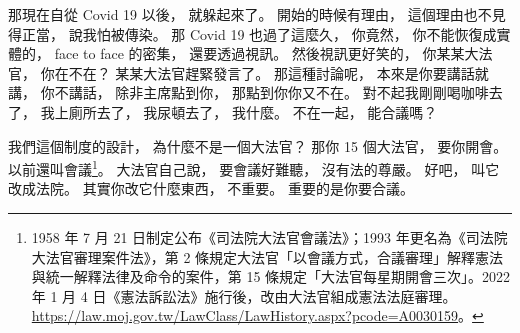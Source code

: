 \hypertarget{w01:cue:970}{}那現在自從 Covid 19 以後，
\hypertarget{w01:cue:971}{}就躲起來了。
\hypertarget{w01:cue:972}{}開始的時候有理由，
\hypertarget{w01:cue:973}{}這個理由也不見得正當，
\hypertarget{w01:cue:974}{}說我怕被傳染。
\hypertarget{w01:cue:975}{}那 Covid 19 也過了這麼久，
\hypertarget{w01:cue:976}{}你竟然，
\hypertarget{w01:cue:977}{}你不能恢復成實體的，
\hypertarget{w01:cue:978}{}face to face 的密集，
\hypertarget{w01:cue:979}{}還要透過視訊。
\hypertarget{w01:cue:980}{}然後視訊更好笑的，
\hypertarget{w01:cue:981}{}你某某大法官，
\hypertarget{w01:cue:982}{}你在不在？
\hypertarget{w01:cue:983}{}某某大法官趕緊發言了。
\hypertarget{w01:cue:984}{}那這種討論呢，
\hypertarget{w01:cue:985}{}本來是你要講話就講，
\hypertarget{w01:cue:986}{}你不講話，
\hypertarget{w01:cue:987}{}除非主席點到你，
\hypertarget{w01:cue:988}{}那點到你你又不在。
\hypertarget{w01:cue:989}{}對不起我剛剛喝咖啡去了，
\hypertarget{w01:cue:990}{}我上廁所去了，
\hypertarget{w01:cue:991}{}我尿頓去了，
\hypertarget{w01:cue:992}{}我什麼。
\hypertarget{w01:cue:993}{}不在一起，
\hypertarget{w01:cue:994}{}能合議嗎？

\hypertarget{w01:cue:995}{}我們這個制度的設計，
\hypertarget{w01:cue:996}{}為什麼不是一個大法官？
\hypertarget{w01:cue:997}{}那你 15 個大法官，
\hypertarget{w01:cue:998}{}要你開會。
\hypertarget{w01:cue:999}{}以前還叫會議\footnote{1958 年 7 月 21 日制定公布《司法院大法官會議法》；1993 年更名為《司法院大法官審理案件法》，第 2 條規定大法官「以會議方式，合議審理」解釋憲法與統一解釋法律及命令的案件，第 15 條規定「大法官每星期開會三次」。2022 年 1 月 4 日《憲法訴訟法》施行後，改由大法官組成憲法法庭審理。\url{https://law.moj.gov.tw/LawClass/LawHistory.aspx?pcode=A0030159}。}。
\hypertarget{w01:cue:1000}{}大法官自己說，
\hypertarget{w01:cue:1001}{}要會議好難聽，
\hypertarget{w01:cue:1002}{}沒有法的尊嚴。
\hypertarget{w01:cue:1003}{}好吧，
\hypertarget{w01:cue:1004}{}叫它改成法院。
\hypertarget{w01:cue:1005}{}其實你改它什麼東西，
\hypertarget{w01:cue:1006}{}不重要。
\hypertarget{w01:cue:1007}{}重要的是你要合議。

